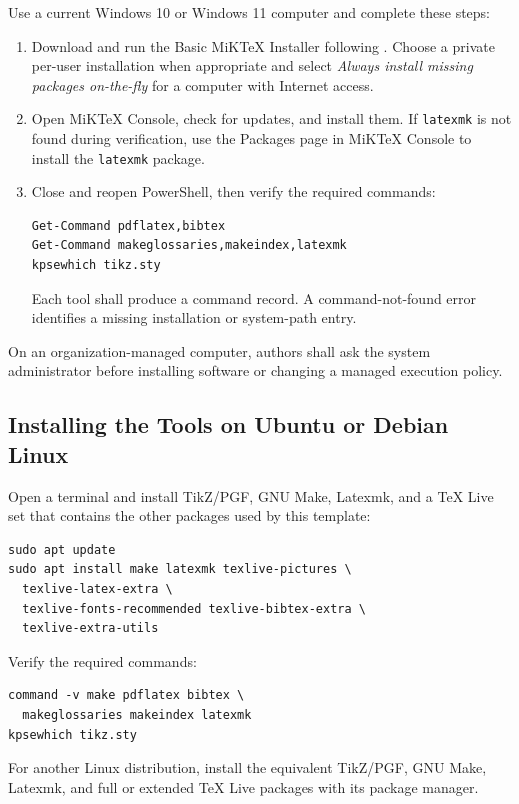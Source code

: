 Use a current Windows 10 or Windows 11 computer and complete these steps:

\begin{enumerate}
  \item Download and run the Basic MiKTeX Installer following \cite{MiKTeXInstallation}. Choose a private per-user installation when appropriate and select \emph{Always install missing packages on-the-fly} for a computer with Internet access.

  \item Open MiKTeX Console, check for updates, and install them. If \texttt{latexmk} is not found during verification, use the Packages page in MiKTeX Console to install the \texttt{latexmk} package.

  \item Close and reopen PowerShell, then verify the required commands:
\begin{verbatim}
Get-Command pdflatex,bibtex
Get-Command makeglossaries,makeindex,latexmk
kpsewhich tikz.sty
\end{verbatim}
  Each tool shall produce a command record. A command-not-found error identifies a missing installation or system-path entry.
\end{enumerate}

On an organization-managed computer, authors shall ask the system administrator
before installing software or changing a managed execution policy.

\subsection{Installing the Tools on Ubuntu or Debian Linux}

Open a terminal and install TikZ/PGF, GNU Make, Latexmk, and a TeX
Live set that contains the other packages used by this template:

\begin{verbatim}
sudo apt update
sudo apt install make latexmk texlive-pictures \
  texlive-latex-extra \
  texlive-fonts-recommended texlive-bibtex-extra \
  texlive-extra-utils
\end{verbatim}

Verify the required commands:

\begin{verbatim}
command -v make pdflatex bibtex \
  makeglossaries makeindex latexmk
kpsewhich tikz.sty
\end{verbatim}

For another Linux distribution, install the equivalent TikZ/PGF, GNU
Make, Latexmk, and full or extended TeX Live packages with its package manager.

